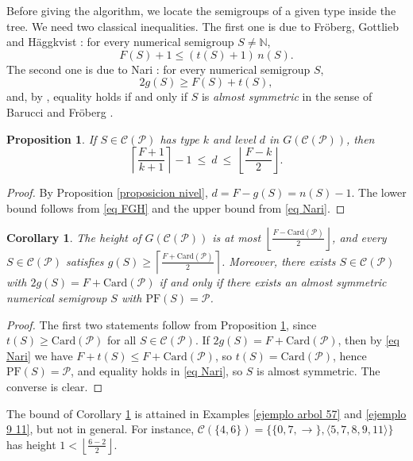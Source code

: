 \documentclass[11pt]{article}
\def\N{\mathbb{N}}
\newtheorem{proposition}[theorem]{Proposition}
\newtheorem{corollary}[theorem]{Corollary}
\numberwithin{equation}{section}
\newcommand{\CP}{\mathcal C(\mathcal P)}
\newcommand{\PF}{\mathrm{PF}}
\begin{document}
Before giving the algorithm, we locate the semigroups of a given type inside the tree. We need two classical inequalities. The first one is due to Fr\"oberg, Gottlieb and H\"aggkvist \cite{froberg}: for every numerical semigroup $S\neq\N$,
\begin{equation}\label{eq FGH}
F(S)+1\leq (t(S)+1)\,n(S).
\end{equation}
The second one is due to Nari \cite[Proposition 2.2]{nari}: for every numerical semigroup $S$,
\begin{equation}\label{eq Nari}
2g(S)\geq F(S)+t(S),
\end{equation}
and, by \cite[Proposition-Definition 2.3]{nari}, equality holds if and only if $S$ is \textit{almost symmetric} in the sense of Barucci and Fr\"oberg \cite{barucci-froberg}.

\begin{proposition}\label{proposicion banda}
If $S\in\CP$ has type $k$ and level $d$ in $G(\CP)$, then
\[
\left\lceil\frac{F+1}{k+1}\right\rceil-1\ \leq\ d\ \leq\ \left\lfloor\frac{F-k}{2}\right\rfloor .
\]
\end{proposition}

\begin{proof}
By Proposition \ref{proposicion nivel}, $d=F-g(S)=n(S)-1$. The lower bound follows from \eqref{eq FGH} and the upper bound from \eqref{eq Nari}.
\end{proof}

\begin{corollary}\label{corolario altura}
The height of $G(\CP)$ is at most $\left\lfloor\frac{F-\mathrm{Card}(\mathcal P)}{2}\right\rfloor$, and every $S\in\CP$ satisfies $g(S)\geq \left\lceil\frac{F+\mathrm{Card}(\mathcal P)}{2}\right\rceil$. Moreover, there exists $S\in\CP$ with $2g(S)=F+\mathrm{Card}(\mathcal P)$ if and only if there exists an almost symmetric numerical semigroup $S$ with $\PF(S)=\mathcal P$.
\end{corollary}

\begin{proof}
The first two statements follow from Proposition \ref{proposicion banda}, since $t(S)\geq \mathrm{Card}(\mathcal P)$ for all $S\in\CP$. If $2g(S)=F+\mathrm{Card}(\mathcal P)$, then by \eqref{eq Nari} we have $F+t(S)\leq F+\mathrm{Card}(\mathcal P)$, so $t(S)=\mathrm{Card}(\mathcal P)$, hence $\PF(S)=\mathcal P$, and equality holds in \eqref{eq Nari}, so $S$ is almost symmetric. The converse is clear.
\end{proof}

The bound of Corollary \ref{corolario altura} is attained in Examples \ref{ejemplo arbol 57} and \ref{ejemplo 9 11}, but not in general. For instance, $\mathcal C(\{4,6\})=\{\{0,7,\rightarrow\},\langle 5,7,8,9,11\rangle\}$ has height $1<\left\lfloor\frac{6-2}{2}\right\rfloor$.
\end{document}
